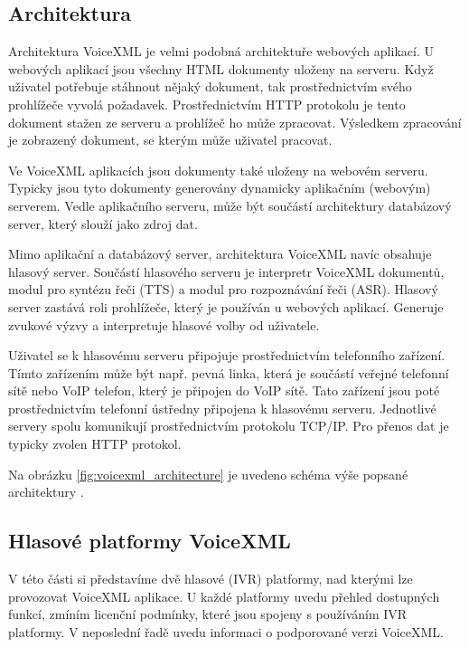 \documentclass[ing,male,java,dept460]{diploma}						%
\begin{document}
\subsection{Architektura}
Architektura VoiceXML je velmi podobná architektuře webových aplikací. U webových aplikací jsou všechny HTML dokumenty uloženy na serveru. Když uživatel potřebuje stáhnout nějaký dokument, tak prostřednictvím svého prohlížeče vyvolá požadavek. Prostřednictvím HTTP protokolu je tento dokument stažen ze serveru a prohlížeč ho může zpracovat. Výsledkem zpracování je zobrazený dokument, se kterým může uživatel pracovat.

Ve VoiceXML aplikacích jsou dokumenty také uloženy na webovém serveru. Typicky jsou tyto dokumenty generovány dynamicky aplikačním (webovým) serverem. Vedle aplikačního serveru, může být součástí architektury databázový server, který slouží jako zdroj dat.

Mimo aplikační a databázový server, architektura VoiceXML navíc obsahuje hlasový server. Součástí hlasového serveru je interpretr VoiceXML dokumentů, modul pro syntézu řeči (TTS) a modul pro rozpoznávání řeči (ASR). Hlasový server zastává roli prohlížeče, který je používán u webových aplikací. Generuje zvukové výzvy a interpretuje hlasové volby od uživatele.

Uživatel se k hlasovému serveru připojuje prostřednictvím telefonního zařízení. Tímto zařízením může být např. pevná linka, která je součástí veřejné telefonní sítě nebo VoIP telefon, který je připojen do VoIP sítě. Tato zařízení jsou poté prostřednictvím telefonní ústředny připojena k hlasovému serveru. Jednotlivé servery spolu komunikují prostřednictvím protokolu TCP/IP. Pro přenos dat je typicky zvolen HTTP protokol.

Na obrázku \ref{fig:voicexml_architecture} je uvedeno schéma výše popsané architektury \cite{vxml_rychlokurz}.


\subsection{Hlasové platformy VoiceXML}
V této části si představíme dvě hlasové (IVR) platformy, nad kterými lze provozovat VoiceXML aplikace. U každé platformy uvedu přehled dostupných funkcí, zmíním licenční podmínky, které jsou spojeny s používáním IVR platformy. V neposlední řadě uvedu informaci o podporované verzi VoiceXML.
\end{document}
